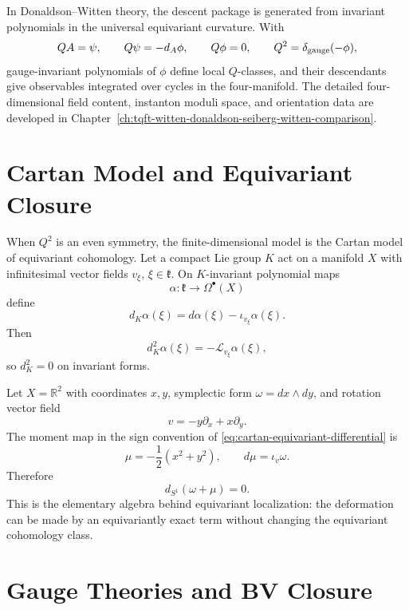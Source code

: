 In Donaldson--Witten theory, the descent package is generated from invariant
polynomials in the universal equivariant curvature.  With
\begin{equation}
  QA=\psi,\qquad Q\psi=-d_A\phi,\qquad Q\phi=0,
  \qquad Q^2=\delta_{\rm gauge}(-\phi),
  \label{eq:dw-universal-q-rules}
\end{equation}
gauge-invariant polynomials of \(\phi\) define local \(Q\)-classes, and their
descendants give observables integrated over cycles in the four-manifold.
The detailed four-dimensional field content, instanton moduli space, and
orientation data are developed in
Chapter~\ref{ch:tqft-witten-donaldson-seiberg-witten-comparison}.

\section{Cartan Model and Equivariant Closure}

When \(Q^2\) is an even symmetry, the finite-dimensional model is the Cartan
model of equivariant cohomology.  Let a compact Lie group \(K\) act on a
manifold \(X\) with infinitesimal vector fields \(v_\xi\),
\(\xi\in\mathfrak k\).  On \(K\)-invariant polynomial maps
\[
  \alpha:\mathfrak k\to\Omega^\bullet(X)
\]
define
\begin{equation}
  d_K\alpha(\xi)
  =
  d\alpha(\xi)-\iota_{v_\xi}\alpha(\xi).
  \label{eq:cartan-equivariant-differential}
\end{equation}
Then
\begin{equation}
  d_K^2\alpha(\xi)=-\mathcal L_{v_\xi}\alpha(\xi),
  \label{eq:cartan-square}
\end{equation}
so \(d_K^2=0\) on invariant forms.

\begin{example}
\label{ex:hamiltonian-s1-equivariant-closure}
Let \(X=\mathbb R^2\) with coordinates \(x,y\), symplectic form
\(\omega=dx\wedge dy\), and rotation vector field
\[
  v=-y\partial_x+x\partial_y.
\]
The moment map in the sign convention of \eqref{eq:cartan-equivariant-differential}
is
\[
  \mu=-\frac12(x^2+y^2),
  \qquad
  d\mu=\iota_v\omega .
\]
Therefore
\[
  d_{S^1}(\omega+\mu)=0.
\]
This is the elementary algebra behind equivariant localization: the
deformation can be made by an equivariantly exact term without changing the
equivariant cohomology class.
\end{example}

\section{Gauge Theories and BV Closure}


